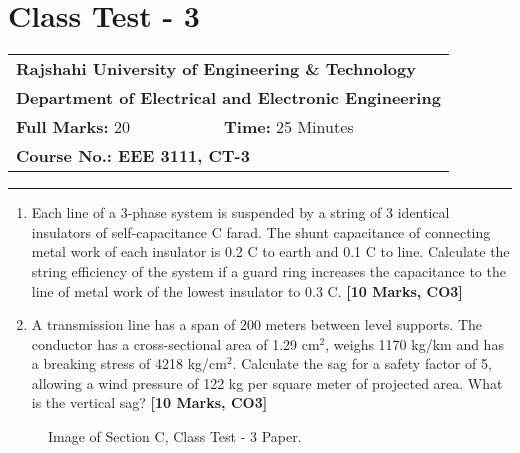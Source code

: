 \documentclass[12pt, a4paper]{article}
\begin{document}
	\section{Class Test - 3}
	\begin{tabular}{ll}
		\multicolumn{2}{l}{\textbf{Rajshahi University of Engineering \& Technology}} \\
		\multicolumn{2}{l}{\textbf{Department of Electrical and Electronic Engineering}} \\
		\textbf{Full Marks:} 20 & \textbf{Time:} 25 Minutes \\
		\multicolumn{2}{l}{\textbf{Course No.: EEE 3111, CT-3}} \\
	\end{tabular}
	\hrule
	\vspace{0.5cm}
	\begin{enumerate}[label=\textbf{Q.\arabic*}]
		\item Each line of a 3-phase system is suspended by a string of 3 identical insulators of self-capacitance C farad. The shunt capacitance of connecting metal work of each insulator is 0.2 C to earth and 0.1 C to line. Calculate the string efficiency of the system if a guard ring increases the capacitance to the line of metal work of the lowest insulator to 0.3 C. \hfill \textbf{[10 Marks, CO3]}
		
		\item A transmission line has a span of 200 meters between level supports. The conductor has a cross-sectional area of 1.29 cm$^2$, weighs 1170 kg/km and has a breaking stress of 4218 kg/cm$^2$. Calculate the sag for a safety factor of 5, allowing a wind pressure of 122 kg per square meter of projected area. What is the vertical sag? \hfill \textbf{[10 Marks, CO3]}
	\end{enumerate}
	\begin{figure}[h!]
		\centering
		\caption{Image of Section C, Class Test - 3 Paper.}
	\end{figure}
	
	\newpage
\end{document}
